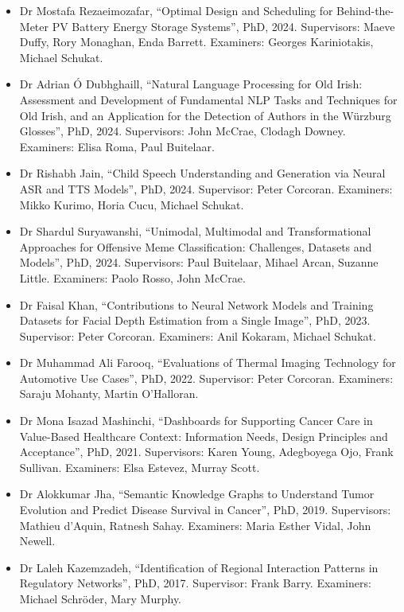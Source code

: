 \documentclass[10pt,a4paper]{res} %
\begin{document}
\begin{resume}
\begin{itemize} \itemsep -2pt
\item Dr Mostafa Rezaeimozafar, ``Optimal Design and Scheduling for Behind-the-Meter PV Battery Energy Storage Systems'', PhD, 2024. Supervisors: Maeve Duffy, Rory Monaghan, Enda Barrett. Examiners: Georges Kariniotakis, Michael Schukat. %
\item Dr Adrian \'{O} Dubhghaill, ``Natural Language Processing for Old Irish: Assessment and Development of Fundamental NLP Tasks and Techniques for Old Irish, and an Application
for the Detection of Authors in the W\"{u}rzburg Glosses'', PhD, 2024. Supervisors: John McCrae, Clodagh Downey. Examiners: Elisa Roma, Paul Buitelaar. %
\item Dr Rishabh Jain, ``Child Speech Understanding and Generation via Neural ASR and TTS Models'', PhD, 2024. Supervisor: Peter Corcoran. Examiners: Mikko Kurimo, Horia Cucu, Michael Schukat. %
\item Dr Shardul Suryawanshi, ``Unimodal, Multimodal and Transformational Approaches for Offensive Meme Classification: Challenges, Datasets and Models'', PhD, 2024. Supervisors: Paul Buitelaar, Mihael Arcan, Suzanne Little. Examiners: Paolo Rosso, John McCrae. %
\item Dr Faisal Khan, ``Contributions to Neural Network Models and Training Datasets for Facial Depth Estimation from a Single Image'', PhD, 2023. Supervisor: Peter Corcoran. Examiners: Anil Kokaram, Michael Schukat. %
\item Dr Muhammad Ali Farooq, ``Evaluations of Thermal Imaging Technology for Automotive Use Cases'', PhD, 2022. Supervisor: Peter Corcoran. Examiners: Saraju Mohanty, Martin O'Halloran. %
\item Dr Mona Isazad Mashinchi, ``Dashboards for Supporting Cancer Care in Value-Based Healthcare Context: Information Needs, Design Principles and Acceptance'', PhD, 2021. Supervisors: Karen Young, Adegboyega Ojo, Frank Sullivan. Examiners: Elsa Estevez, Murray Scott.
\item Dr Alokkumar Jha, ``Semantic Knowledge Graphs to Understand Tumor Evolution and Predict Disease Survival in Cancer'', PhD, 2019. Supervisors: Mathieu d'Aquin, Ratnesh Sahay. Examiners: Maria Esther Vidal, John Newell.
\item Dr Laleh Kazemzadeh, ``Identification of Regional Interaction Patterns in Regulatory Networks'', PhD, 2017. Supervisor: Frank Barry. Examiners: Michael Schr\"{o}der, Mary Murphy.

\end{itemize}
\end{resume}
\end{document}
